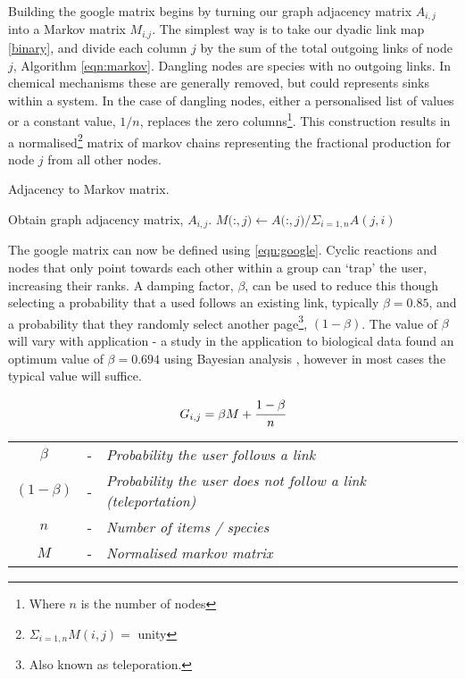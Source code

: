 \documentclass[twoside,reqno]{article}
\begin{document}
Building the google matrix begins by turning our graph adjacency matrix $A_{i,j}$ into a Markov matrix $M_{i.j}$. The simplest way is to take our dyadic link map \autoref{binary}, and divide each column $j$ by the sum of the total outgoing links of node $j$, Algorithm \ref{eqn:markov}. Dangling nodes are species with no outgoing links. In chemical mechanisms these are generally removed, but could represents sinks within a system. In the case of dangling nodes, either a personalised list of values or a constant value, $1/n$, replaces the zero columns\footnote{Where $n$ is the number of nodes}.  This construction results in a normalised\footnote{ \: $\Sigma_{i=1,n} M(i,j) = $ unity} matrix of markov chains representing the fractional production for node $j$ from all other nodes. \\

\begin{algorithm} \caption{Adjacency to Markov matrix.}
\begin{algorithmic}[1]
\State Obtain graph adjacency matrix, $A_{i,j}$.
\Repeat
{}
\State $M($:$,j) \gets A($:$,j) / \Sigma_{i=1,n} A(j,i)$
\EndFor
{}

\end{algorithmic}\label{eqn:markov}
\end{algorithm}



The google matrix can now be defined using \autoref{eqn:google}. Cyclic reactions and nodes that only point towards each other within a group can `trap' the user, increasing their ranks. A damping factor, $\beta$, can be used to reduce this though selecting a probability that a used follows an existing link, typically $\beta = 0.85$, and a probability that they randomly select another page\footnote{Also known as teleporation.}, $(1-\beta)$. The value of $\beta$ will vary with application - a study in the application to biological data found an optimum value of $\beta = 0.694$ using Bayesian analysis \cite{biopr}, however in most cases the typical value will suffice.


\begin{center}
\begin{equation}
     G_{i,j} = \beta M + \cfrac{1 - \beta}{n}
 \label{eqn:google}
\end{equation}
\begin{tabular}{ccl}
$\beta$&-&\textit{Probability the user follows a link} \\
 $(1 - \beta)$&-&\textit{Probability the user does not follow a link (teleportation)} \\
$n$&-&\textit{Number of items / species}\\
$M$&-&\textit{Normalised markov matrix}
\end{tabular}
\end{center}
\end{document}
